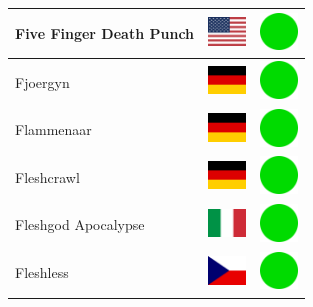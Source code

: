\documentclass[12pt, a4paper, twoside]{report}
\begin{document}
\begin{center}
\begin{longtable}{|p{5cm}|p{2cm}|p{2cm}|}
 Five Finger Death Punch                                    & \includegraphics[width=1cm]{../img/flags/us} &   \includegraphics[width=1cm]{../likes/y} \\ \hline
 Fjoergyn                                                   & \includegraphics[width=1cm]{../img/flags/de} &   \includegraphics[width=1cm]{../likes/y} \\ \hline
 Flammenaar                                                 & \includegraphics[width=1cm]{../img/flags/de} &   \includegraphics[width=1cm]{../likes/y} \\ \hline
 Fleshcrawl                                                 & \includegraphics[width=1cm]{../img/flags/de} &   \includegraphics[width=1cm]{../likes/y} \\ \hline
 Fleshgod Apocalypse                                        & \includegraphics[width=1cm]{../img/flags/it} &   \includegraphics[width=1cm]{../likes/y} \\ \hline
 Fleshless                                                  & \includegraphics[width=1cm]{../img/flags/cz} &   \includegraphics[width=1cm]{../likes/y} \\ \hline

\end{longtable}
\end{center}
\end{document}
